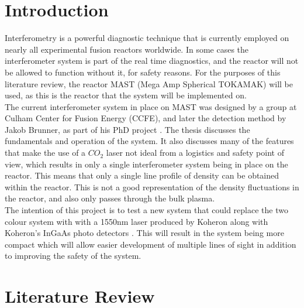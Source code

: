 \documentclass[12pt,a4paper,oneside]{report}
\begin{document}
\chapter{Introduction}
Interferometry is a powerful diagnostic technique that is currently employed on nearly all experimental fusion reactors worldwide. In some cases the interferometer system is part of the real time diagnostics, and the reactor will not be allowed to function without it, for safety reasons. For the purposes of this literature review, the reactor MAST (Mega Amp Spherical TOKAMAK) will be used, as this is the reactor that the system will be implemented on.\\
The current interferometer system in place on MAST was designed by a group at Culham Center for Fusion Energy (CCFE), and later the detection method by Jakob Brunner, as part of his PhD project \cite{Brunner2017}. The thesis discusses the fundamentals and operation of the system. It also discusses many of the features that make the use of a $CO_{2}$ laser not ideal from a logistics and safety point of view, which results in only a single interferometer system being in place on the reactor. This means that only a single line profile of density can be obtained within the reactor. This is not a good representation of the density fluctuations in the reactor, and also only passes through the bulk plasma.\\
The intention of this project is to test a new system that could replace the two colour system with with a 1550nm laser produced by Koheron \cite{KoheronLaserV1} along with Koheron's InGaAs photo detectors \cite{KoheronPD100Photodetector}. This will result in the system being more compact which will allow easier development of multiple lines of sight in addition to improving the safety of the system. %


\chapter{Literature Review}
\end{document}
